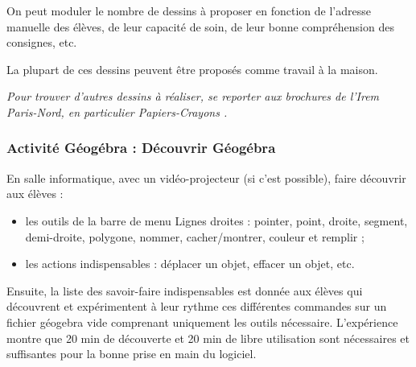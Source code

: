 On peut moduler le nombre de dessins à proposer en fonction de l’adresse manuelle des élèves, de leur capacité de soin, de leur bonne compréhension des consignes, etc.

La plupart de ces dessins peuvent être proposés comme travail à la maison.

\textit{Pour trouver d’autres dessins à réaliser, se reporter aux brochures de l’Irem Paris-Nord, en particulier \og Papiers-Crayons \fg{}.}

\subsubsection{ Activité Géogébra : Découvrir Géogébra}

En salle informatique, avec un vidéo-projecteur (si c’est possible), faire découvrir aux élèves :
\begin{itemize}
  \item les outils de la barre de menu \og Lignes droites \fg{} : pointer, point, droite, segment, demi-droite, polygone, nommer, cacher/montrer, couleur et remplir ;
  \item les actions indispensables : déplacer un objet, effacer un objet, etc.
\end{itemize}

Ensuite, la liste des savoir-faire indispensables est donnée aux élèves qui découvrent et expérimentent à leur rythme ces différentes commandes sur un fichier géogebra vide comprenant uniquement les outils nécessaire.
L’expérience montre que 20 min de découverte et 20 min de libre utilisation sont nécessaires et suffisantes pour la bonne prise en main du logiciel.

